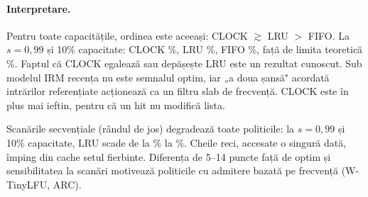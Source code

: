 \paragraph{Interpretare.} Pentru toate capacitățile, ordinea este aceeași: CLOCK $\gtrsim$ LRU $>$ FIFO. La
$s = 0{,}99$ și 10\% capacitate: CLOCK \%, LRU \%, FIFO
\%, față de limita teoretică \%. Faptul că CLOCK egalează sau
depășește LRU este un rezultat cunoscut. Sub modelul IRM recența nu este semnalul optim, iar „a doua șansă"
acordată intrărilor referențiate acționează ca un filtru slab de frecvență. CLOCK este în plus mai ieftin,
pentru că un hit nu modifică lista.

Scanările secvențiale (rândul de jos) degradează toate politicile: la $s=0{,}99$ și 10\% capacitate, LRU
scade de la \% la \%. Cheile reci, accesate o singură dată,
împing din cache setul fierbinte. Diferența de 5–14 puncte față de optim și sensibilitatea la scanări motivează
politicile cu admitere bazată pe frecvență (W-TinyLFU, ARC).
